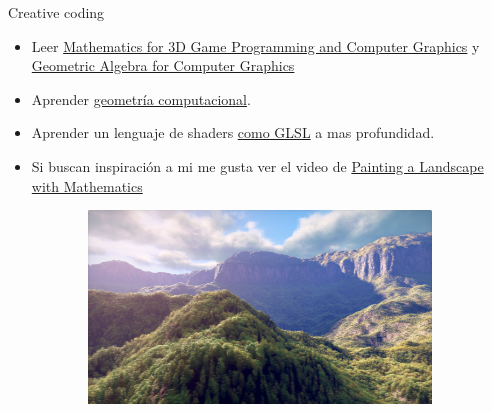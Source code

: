 \begin{frame}{Creative coding}
\begin{itemize}
    \item Leer \href{https://www.amazon.com/Mathematics-Programming-Computer-Graphics-Third/dp/1435458869}{Mathematics for 3D Game Programming and Computer Graphics} y \href{https://link.springer.com/book/10.1007/978-1-84628-997-2}{Geometric Algebra for Computer Graphics}
    \item Aprender \href{https://en.wikipedia.org/wiki/Computational_geometry}{geometría computacional}.
    \item Aprender un lenguaje de shaders \href{https://www.amazon.com/OpenGL-Shading-Language-Cookbook-high-quality/dp/1789342252/}{como GLSL} a mas profundidad.
    \item Si buscan inspiración a mi me gusta ver el video de \href{https://www.youtube.com/watch?v=BFld4EBO2RE}{Painting a Landscape with Mathematics}
\end{itemize}
\begin{figure}[htp]
 \centering
 \begin{subfigure}[b]{0.3\textwidth}
   \includegraphics[width=\textwidth]{img/RainForest}
 \end{subfigure}
~
 \begin{subfigure}[b]{0.12\textwidth}

\end{subfigure}
\end{figure}
\end{frame}
